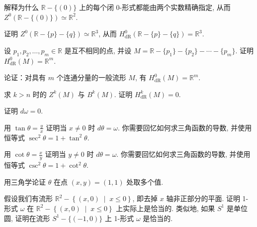 \begin{question}\label{q:B-3}
解释为什么 $\mathbb{R}-\{(0)\}$ 上的每个闭 0-形式都能由两个实数精确指定, 从而 $Z^0\left(\mathbb{R}-\{(0)\}\right)\simeq\mathbb{R}^2$.
\end{question}

\begin{question}\label{q:B-4}
证明 $Z^0\left(\mathbb{R}-\{p\}-\{q\}\right)\simeq\mathbb{R}^3$, 从而 $H_{\mathrm{dR}}^0\left(\mathbb{R}-\{p\}-\{q\}\right)=\mathbb{R}^3$.
\end{question}

\begin{question}\label{q:B-5}
设 $p_1,p_2,\ldots,p_m\in\mathbb{R}$ 是互不相同的点, 并设 $M=\mathbb{R}-\{p_1\}-\{p_2\}-\cdots-\{p_m\}$. 证明 $H_{\mathrm{dR}}^0(M)=\mathbb{R}^m$.
\end{question}

\begin{question}\label{q:B-6}
论证：对具有 $m$ 个连通分量的一般流形 $M$, 有 $H_{\mathrm{dR}}^0(M)=\mathbb{R}^m$.
\end{question}

\begin{question}\label{q:B-7}
求 $k>n$ 时的 $Z^k(M)$ 与 $B^k(M)$. 证明 $H_{\mathrm{dR}}^k(M)=0$.
\end{question}

\begin{question}\label{q:B-8}
证明 $d\omega=0$.
\end{question}

\begin{question}\label{q:B-9}
用 $\tan\theta=\frac{y}{x}$ 证明当 $x\neq0$ 时 $d\theta=\omega$. 你需要回忆如何求三角函数的导数, 并使用恒等式 $\sec^2\theta=1+\tan^2\theta$.
\end{question}

\begin{question}\label{q:B-10}
用 $\cot\theta=\frac{x}{y}$ 证明当 $y\neq0$ 时 $d\theta=\omega$. 你需要回忆如何求三角函数的导数, 并使用恒等式 $\csc^2\theta=1+\cot^2\theta$.
\end{question}

\begin{question}\label{q:B-11}
用三角学论证 $\theta$ 在点 $(x,y)=(1,1)$ 处取多个值.
\end{question}

\begin{question}\label{q:B-12}
假设我们有流形 $\mathbb{R}^2-\left\{(x,0)\;\middle|\;x\leq0\right\}$, 即去掉 $x$ 轴非正部分的平面. 证明 1-形式 $\omega$ 在 $\mathbb{R}^2-\left\{(x,0)\;\middle|\;x\leq0\right\}$ 上实际上是恰当的. 类似地, 如果 $S^1$ 是单位圆, 证明在流形 $S^1-\{(-1,0)\}$ 上 1-形式 $\omega$ 是恰当的.
\end{question}

